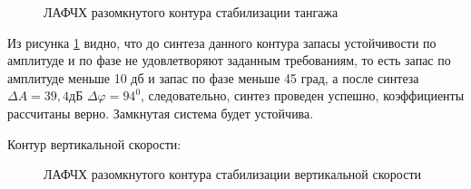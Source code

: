 \begin{figure}[H]
    \caption{ЛАФЧХ разомкнутого контура стабилизации тангажа}
    \label{fig:Тангаж раз qKR}
\end{figure}

Из рисунка \ref{fig:Тангаж раз qKR} видно, что до синтеза данного контура запасы устойчивости по амплитуде и по фазе не удовлетворяют заданным требованиям, то есть запас по амплитуде меньше 10 дб и запас по фазе меньше 45 град, а после синтеза $\Delta A = 39,4 $дБ $\Delta \varphi = 94^0$, следовательно, синтез проведен успешно, коэффициенты рассчитаны верно. Замкнутая система будет устойчива.  

\begin{center}
    Контур вертикальной скорости:
\end{center}

\begin{figure}[H]
    \caption{ЛАФЧХ разомкнутого контура стабилизации вертикальной скорости}
    \label{fig:Вертикальная скорость раз qKR}
\end{figure}

